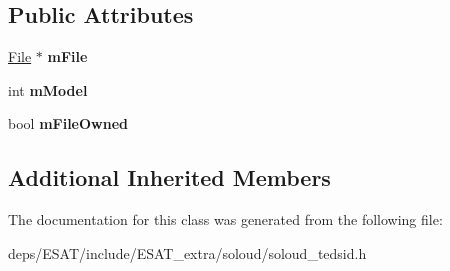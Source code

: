 \subsection*{Public Attributes}
\begin{DoxyCompactItemize}
\item 
\mbox{\label{class_so_loud_1_1_ted_sid_af02ef0eb966676b1978e701e0289bdd6}} 
\mbox{\hyperlink{class_so_loud_1_1_file}{File}} $\ast$ {\bfseries m\+File}
\item 
\mbox{\label{class_so_loud_1_1_ted_sid_a4a0103540e6e109e2373cf02822187cc}} 
int {\bfseries m\+Model}
\item 
\mbox{\label{class_so_loud_1_1_ted_sid_a9fdc31b3baa994d61c4886c76cd92cf8}} 
bool {\bfseries m\+File\+Owned}
\end{DoxyCompactItemize}
\subsection*{Additional Inherited Members}


The documentation for this class was generated from the following file\+:\begin{DoxyCompactItemize}
\item 
deps/\+E\+S\+A\+T/include/\+E\+S\+A\+T\+\_\+extra/soloud/soloud\+\_\+tedsid.\+h\end{DoxyCompactItemize}
